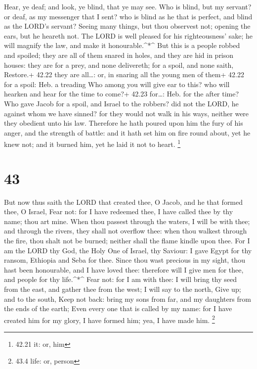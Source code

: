  Hear, ye deaf; and look, ye blind, that ye may see.
 Who is blind, but my servant? or deaf, as my messenger
that I sent? who is blind as he that is perfect, and blind as the LORD's
servant?  Seeing many things, but thou observest not;
opening the ears, but he heareth not.  The LORD is well
pleased for his righteousness' sake; he will magnify the law, and make
it honourable.\^{}*\^{}  But this is a people robbed and
spoiled; they are all of them snared in holes, and they are hid in
prison houses: they are for a prey, and none delivereth; for a spoil,
and none saith, Restore.+ 42.22 they are all\ldots: or, in snaring all
the young men of them+ 42.22 for a spoil: Heb. a treading 
Who among you will give ear to this? who will hearken and hear for the
time to come?+ 42.23 for\ldots: Heb. for the after time? 
Who gave Jacob for a spoil, and Israel to the robbers? did not the LORD,
he against whom we have sinned? for they would not walk in his ways,
neither were they obedient unto his law.  Therefore he hath
poured upon him the fury of his anger, and the strength of battle: and
it hath set him on fire round about, yet he knew not; and it burned him,
yet he laid it not to heart. \footnote{42.21 it: or, him}

\hypertarget{section-42}{%
\section{43}\label{section-42}}

 But now thus saith the LORD that created thee, O Jacob, and
he that formed thee, O Israel, Fear not: for I have redeemed thee, I
have called thee by thy name; thou art mine.  When thou
passest through the waters, I will be with thee; and through the rivers,
they shall not overflow thee: when thou walkest through the fire, thou
shalt not be burned; neither shall the flame kindle upon thee.
 For I am the LORD thy God, the Holy One of Israel, thy
Saviour: I gave Egypt for thy ransom, Ethiopia and Seba for thee.
 Since thou wast precious in my sight, thou hast been
honourable, and I have loved thee: therefore will I give men for thee,
and people for thy life.\^{}*\^{}  Fear not: for I am with
thee: I will bring thy seed from the east, and gather thee from the
west;  I will say to the north, Give up; and to the south,
Keep not back: bring my sons from far, and my daughters from the ends of
the earth;  Even every one that is called by my name: for I
have created him for my glory, I have formed him; yea, I have made him.
\footnote{43.4 life: or, person}

